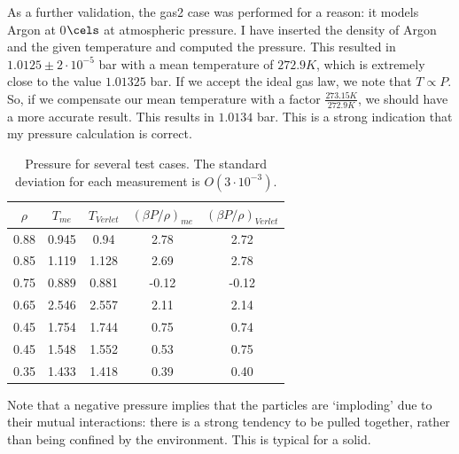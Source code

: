As a further validation, the gas2 case was performed for a reason: it models
Argon at 0$\cels$ at atmospheric pressure. I have inserted the density of Argon
and the given temperature and computed the pressure. This resulted in $1.0125
\pm 2\cdot 10^{-5}$ bar with a mean temperature of $272.9K$, which is extremely
close to the value $1.01325$ bar. If we accept the ideal gas law, we note that
$T \propto P$. So, if we compensate our mean temperature with a factor
$\frac{273.15 K}{272.9 K}$, we should have a more accurate result. This results
in $1.0134$ bar. This is a strong indication that my pressure calculation is
correct.

\begin{table}
\centering
\caption{Pressure for several test cases. The standard deviation for each
measurement is $O(3 \cdot 10^{-3})$.} \begin{tabular}{|c|c|c|c|c|} \hline
$\rho$&$T_{me}$&$T_{Verlet}$&$(\beta P/\rho)_{me}$&$(\beta P/\rho)_{Verlet}$ \\
\hline
0.88&0.945&0.94&2.78&2.72\\ \hline
0.85&1.119&1.128&2.69&2.78\\ \hline
0.75&0.889&0.881&-0.12&-0.12\\ \hline
0.65&2.546&2.557&2.11&2.14\\ \hline
0.45&1.754&1.744&0.75&0.74\\ \hline
0.45&1.548&1.552&0.53&0.75\\ \hline
0.35&1.433&1.418&0.39&0.40\\ \hline
\end{tabular}
\label{tab:pressure}
\end{table}

Note that a negative pressure implies that the particles are `imploding' due to
their mutual interactions: there is a strong tendency to be pulled together,
rather than being confined by the environment. This is typical for a solid.


